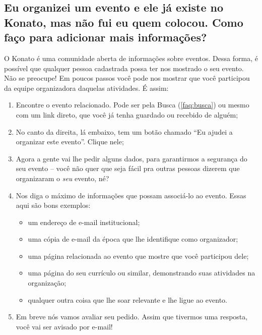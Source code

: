 \documentclass[12pt,a4paper,twoside,hyphens,english,brazil]{abntex2}
\newcommand{\adiado}{{\color{Bittersweet}\framebox[1.1\width]{ADIADO}}}
\begin{document}
{\subsection[Como faço para reivindicar um evento que já adicionaram?]{Eu organizei um evento e ele já existe no Konato, mas não fui eu quem colocou. Como faço para adicionar mais informações?} \label{faq:reivindicar}
\adiado{} O Konato é uma comunidade aberta de informações sobre eventos. Dessa forma, é possível que qualquer pessoa cadastrada possa ter nos mostrado o seu evento. Não se preocupe! Em poucos passos você pode nos mostrar que você participou da equipe organizadora daquelas atividades. É assim:
\begin{enumerate}[itemsep=-1ex]
	\item Encontre o evento relacionado. Pode ser pela Busca (\autoref{faq:busca}) ou mesmo com um link direto, que você já tenha guardado ou recebido de alguém;
	\item No canto da direita, lá embaixo, tem um botão chamado ``Eu ajudei a organizar este evento''. Clique nele;
	\item Agora a gente vai lhe pedir alguns dados, para garantirmos a segurança do seu evento -- você não quer que seja fácil pra outras pessoas dizerem que organizaram o \emph{seu} evento, né?
	\item Nos diga o máximo de informações que possam associá-lo ao evento. Essas aqui são bons exemplos:
		\begin{itemize}[itemsep=-1ex]
			\item um endereço de e-mail institucional;
			\item uma cópia de e-mail da época que lhe identifique como organizador;
			\item uma página relacionada ao evento que mostre que você participou dele;
			\item uma página do seu currículo ou similar, demonstrando suas atividades na organização;
			\item qualquer outra coisa que lhe soar relevante e lhe ligue ao evento.
		\end{itemize}
	\item Em breve nós vamos avaliar seu pedido. Assim que tivermos uma resposta, você vai ser avisado por e-mail!
\end{enumerate}

}
\end{document}
